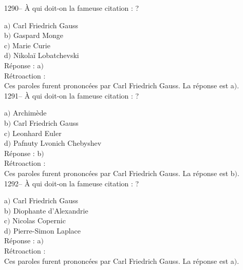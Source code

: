 ﻿\documentclass[letterpaper, 12pt]{article}
\begin{document}
1290-- \`A qui doit-on la fameuse citation : \fg ?

a$)$ Carl Friedrich Gauss \\
b$)$ Gaspard Monge \\
c$)$ Marie Curie \\
d$)$ Nikola\"i Lobatchevski\\

R\'eponse : a$)$\\

R\'etroaction :\\
Ces paroles furent prononc\'ees par Carl Friedrich
Gauss.
La r\'eponse est  a$)$.\\

1291-- \`A qui doit-on la fameuse citation : \fg?

a$)$ Archim\`ede \\
b$)$ Carl Friedrich Gauss \\
c$)$ Leonhard Euler \\
d$)$ Pafnuty Lvonich Chebyshev\\

R\'eponse : b$)$\\

R\'etroaction : \\
Ces paroles furent prononc\'ees par Carl Friedrich Gauss.
La r\'eponse est  b$)$.\\

1292-- \`A qui doit-on la fameuse citation : \fg ?

a$)$ Carl Friedrich Gauss \\
b$)$ Diophante d'Alexandrie \\
c$)$ Nicolas Copernic \\
d$)$ Pierre-Simon Laplace\\

R\'eponse : a$)$\\

R\'etroaction : \\
Ces paroles furent prononc\'ees par Carl Friedrich Gauss.
La r\'eponse est  a$)$.\\
\end{document}
